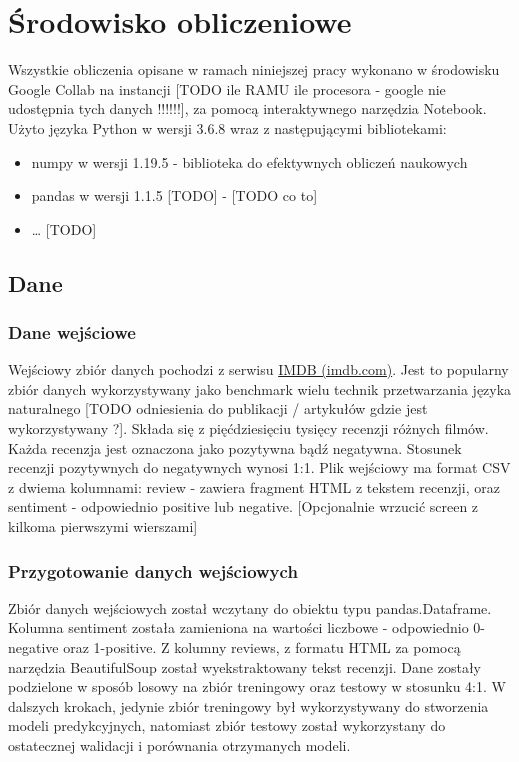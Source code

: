 \chapter{Środowisko obliczeniowe}

Wszystkie obliczenia opisane w ramach niniejszej pracy wykonano w środowisku Google Collab na instancji [TODO ile RAMU ile procesora - google nie udostępnia tych danych !!!!!!], za pomocą interaktywnego narzędzia Notebook. Użyto języka Python w wersji 3.6.8 wraz z następującymi bibliotekami:
\begin{itemize}
	\item numpy w wersji 1.19.5 - biblioteka do efektywnych obliczeń naukowych
	\item pandas w wersji 1.1.5 [TODO] - [TODO co to]
	\item … [TODO]
\end{itemize}

\section{Dane}
\subsection{Dane wejściowe}

Wejściowy zbiór danych pochodzi z serwisu \href{https://ai.stanford.edu/~amaas/data/sentiment/}{IMDB (imdb.com)}. Jest to popularny zbiór danych wykorzystywany jako benchmark wielu technik przetwarzania języka naturalnego [TODO odniesienia do publikacji / artykułów gdzie jest wykorzystywany ?]. Składa się z pięćdziesięciu tysięcy recenzji różnych filmów. Każda recenzja jest oznaczona jako pozytywna bądź negatywna. Stosunek recenzji pozytywnych do negatywnych wynosi 1:1. Plik wejściowy ma format CSV z dwiema kolumnami: review - zawiera fragment HTML z tekstem recenzji, oraz sentiment - odpowiednio positive lub negative.
[Opcjonalnie wrzucić screen z kilkoma pierwszymi wierszami]

\subsection{Przygotowanie danych wejściowych}

Zbiór danych wejściowych został wczytany do obiektu typu pandas.Dataframe. Kolumna sentiment została zamieniona na wartości liczbowe - odpowiednio 0-negative oraz 1-positive. Z kolumny reviews, z formatu HTML za pomocą narzędzia BeautifulSoup został wyekstraktowany tekst recenzji. Dane zostały podzielone w sposób losowy na zbiór treningowy oraz testowy w stosunku 4:1. W dalszych krokach, jedynie zbiór treningowy był wykorzystywany do stworzenia modeli predykcyjnych, natomiast zbiór testowy został wykorzystany do ostatecznej walidacji i porównania otrzymanych modeli.